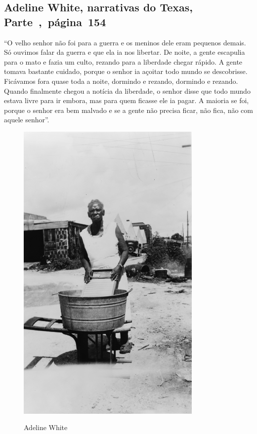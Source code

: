 \subsection{Adeline White, narrativas do Texas, Parte~,~página~154}
\label{ref282}

``O velho senhor não foi para a guerra e os meninos dele eram pequenos
demais. Só ouvimos falar da guerra e que ela ia nos libertar. De noite,
a gente escapulia para o mato e fazia um culto, rezando para a liberdade
chegar rápido. A gente tomava bastante cuidado, porque o senhor ia
açoitar todo mundo se descobrisse. Ficávamos fora quase toda a noite,
dormindo e rezando, dormindo e rezando. Quando finalmente chegou a
notícia da liberdade, o senhor disse que todo mundo estava livre para ir
embora, mas para quem ficasse ele ia pagar. A maioria se foi, porque o
senhor era bem malvado e se a gente não precisa ficar, não fica, não com
aquele senhor''.

\begin{figure}[]
\centering
 \includegraphics[width=90mm]{./imgs/adlinewhite_recorte.jpg} \label{img23}
\caption{Adeline White}
\end{figure}

